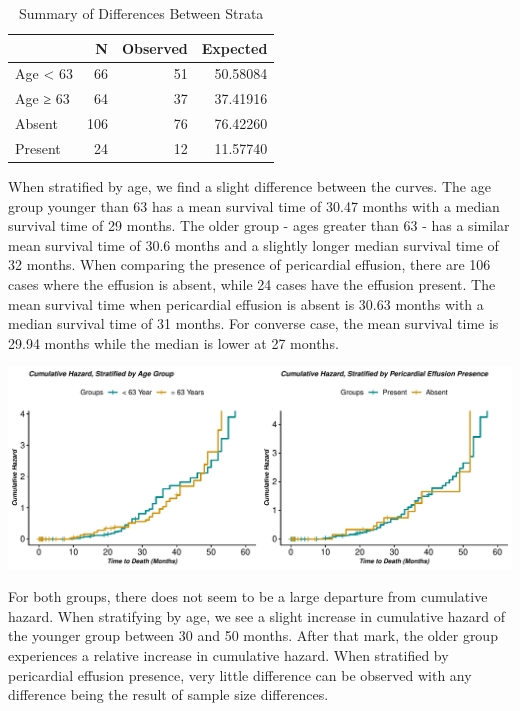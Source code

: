 \documentclass[
]{article}
\begin{document}
\begin{table}

\caption{\label{tab:ks2.survdiff}Summary of Differences Between Strata}
\centering
\begin{tabular}[t]{l|r|r|r}
\hline
  & N & Observed & Expected\\
\hline
Age < 63 & 66 & 51 & 50.58084\\
\hline
Age ≥ 63 & 64 & 37 & 37.41916\\
\hline
Absent & 106 & 76 & 76.42260\\
\hline
Present & 24 & 12 & 11.57740\\
\hline
\end{tabular}
\end{table}

When stratified by age, we find a slight difference between the curves.
The age group younger than 63 has a mean survival time of 30.47 months
with a median survival time of 29 months. The older group - ages greater
than 63 - has a similar mean survival time of 30.6 months and a slightly
longer median survival time of 32 months. When comparing the presence of
pericardial effusion, there are 106 cases where the effusion is absent,
while 24 cases have the effusion present. The mean survival time when
pericardial effusion is absent is 30.63 months with a median survival
time of 31 months. For converse case, the mean survival time is 29.94
months while the median is lower at 27 months.

\begin{center}\includegraphics{markdown_files/figure-latex/km.haz1-1} \end{center}

For both groups, there does not seem to be a large departure from
cumulative hazard. When stratifying by age, we see a slight increase in
cumulative hazard of the younger group between 30 and 50 months. After
that mark, the older group experiences a relative increase in cumulative
hazard. When stratified by pericardial effusion presence, very little
difference can be observed with any difference being the result of
sample size differences.
\end{document}
